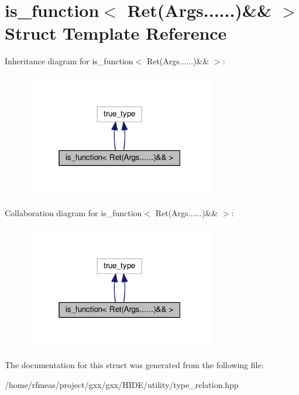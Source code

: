 \hypertarget{structis__function_3_01Ret_07Args_8_8_8_8_8_8_08_6_6_01_4}{}\section{is\+\_\+function$<$ Ret(Args......)\&\& $>$ Struct Template Reference}
\label{structis__function_3_01Ret_07Args_8_8_8_8_8_8_08_6_6_01_4}


Inheritance diagram for is\+\_\+function$<$ Ret(Args......)\&\& $>$\+:
\nopagebreak
\begin{figure}[H]
\begin{center}
\leavevmode
\includegraphics[width=235pt]{structis__function_3_01Ret_07Args_8_8_8_8_8_8_08_6_6_01_4__inherit__graph}
\end{center}
\end{figure}


Collaboration diagram for is\+\_\+function$<$ Ret(Args......)\&\& $>$\+:
\nopagebreak
\begin{figure}[H]
\begin{center}
\leavevmode
\includegraphics[width=235pt]{structis__function_3_01Ret_07Args_8_8_8_8_8_8_08_6_6_01_4__coll__graph}
\end{center}
\end{figure}


The documentation for this struct was generated from the following file\+:\begin{DoxyCompactItemize}
\item 
/home/rfmeas/project/gxx/gxx/\+H\+I\+D\+E/utility/type\+\_\+relation.\+hpp\end{DoxyCompactItemize}
